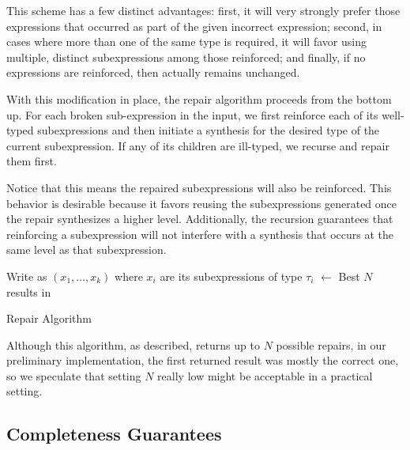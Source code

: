 This scheme has a few distinct advantages: first, it will very
strongly prefer those expressions that occurred as part of the given
incorrect expression; second, in cases where more than one of the same
type is required, it will favor using multiple, distinct
subexpressions among those reinforced; and finally, if no
expressions are reinforced, then \Cost actually remains unchanged.

With this modification in place, the repair algorithm proceeds from
the bottom up. For each broken sub-expression in the input, we first
reinforce each of its well-typed subexpressions and then initiate a
synthesis for the desired type of the current subexpression. If any of
its children are ill-typed, we recurse and repair them first.

Notice that this means the repaired subexpressions will also be
reinforced. This behavior is desirable because it favors reusing the
subexpressions generated once the repair synthesizes a higher
level. Additionally, the recursion guarantees that reinforcing a
subexpression will not interfere with a synthesis that occurs at the
same level as that subexpression.
\begin{algorithm}[hbt]
\BlankLine
{}
Write \Expr as \Expr$(x_1, \ldots, x_k)$ where $x_i$ are its subexpressions of type $\tau_i$ \;
\Repairs $\longleftarrow$ Best $N$ results in \Repairs
\caption{Repair Algorithm}\label{proc:repair}
\end{algorithm}
Although this algorithm, as described, returns up to $N$ possible
repairs, in our preliminary implementation, the first returned
result was mostly the correct one, so we speculate that setting $N$ really low might be
acceptable in a practical setting.

\iffalse

\subsection{Completeness Guarantees}

